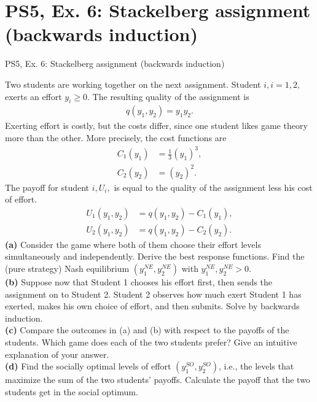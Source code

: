 \section{PS5, Ex. 6: Stackelberg assignment (backwards induction)}

\begin{frame}{PS5, Ex. 6: Stackelberg assignment (backwards induction)}
  \begin{multicols}{2}
    Two students are working together on the next assignment. Student $i, i = 1, 2,$ exerts an effort $y_i\geq0$. The resulting quality of the assignment is
    \begin{align*}
      q(y_1, y_2) = y_1y_2.
    \end{align*}
    Exerting effort is costly, but the costs differ, since one student likes game theory more than the other. More precisely, the cost functions are
    \begin{align*}
      C_1(y_1) &= \frac{1}{3}(y_1)^3,\\
      C_2(y_2) &= (y_2)^2.
    \end{align*}
    The payoff for student $i, U_i,$ is equal to the quality of the assignment less his cost of effort.
    \begin{align*}
      U_1(y_1,y_2)&=q(y_1,y_2)-C_1(y_1),\\
      U_2(y_1,y_2)&=q(y_1,y_2)-C_2(y_2).
    \end{align*}
    \vfill\null \columnbreak
    \textbf{(a)} Consider the game where both of them choose their effort levels simultaneously and independently. Derive the best response functions. Find the (pure strategy) Nash equilibrium $(y_1^{NE}, y_2^{NE})$ with $y_1^{NE}, y_2^{NE} > 0$.\\
    \textbf{(b)} Suppose now that Student 1 chooses his effort first, then sends the assignment on to Student 2. Student 2 observes how much exert Student 1 has exerted, makes his own choice of effort, and then submits. Solve by backwards induction.\\
    \textbf{(c)} Compare the outcomes in (a) and (b) with respect to the payoffs of the students. Which game does each of the two students prefer? Give an intuitive explanation of your answer.\\
    \textbf{(d)} Find the socially optimal levels of effort $(y_1^{SO}, y_2^{SO})$, i.e., the levels that maximize the sum of the two students’ payoffs. Calculate the payoff that the two students get in the social optimum.
    \vfill\null
  \end{multicols}
\end{frame}

